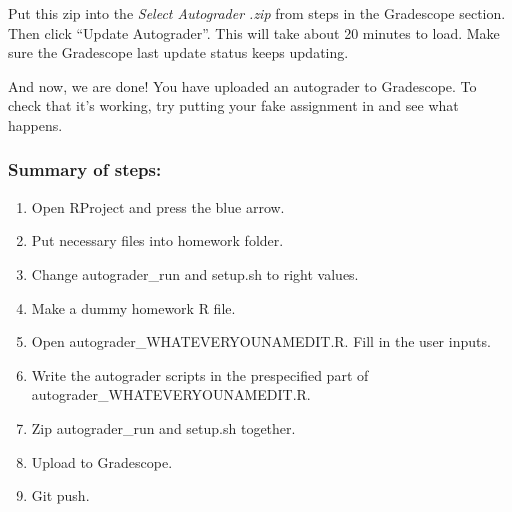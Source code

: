\documentclass[
]{article}
\begin{document}
Put this zip into the \emph{Select Autograder .zip} from steps in the
Gradescope section. Then click ``Update Autograder''. This will take
about 20 minutes to load. Make sure the Gradescope last update status
keeps updating.

\begin{center}
\end{center}

And now, we are done! You have uploaded an autograder to Gradescope. To
check that it's working, try putting your fake assignment in and see
what happens.

\hypertarget{summary-of-steps}{%
\subsubsection{Summary of steps:}\label{summary-of-steps}}

\begin{enumerate}
\def\labelenumi{\arabic{enumi})}
\item
  Open RProject and press the blue arrow.
\item
  Put necessary files into homework folder.
\item
  Change autograder\_run and setup.sh to right values.
\item
  Make a dummy homework R file.
\item
  Open autograder\_WHATEVERYOUNAMEDIT.R. Fill in the user inputs.
\item
  Write the autograder scripts in the prespecified part of
  autograder\_WHATEVERYOUNAMEDIT.R.
\item
  Zip autograder\_run and setup.sh together.
\item
  Upload to Gradescope.
\item
  Git push.
\end{enumerate}
\end{document}
